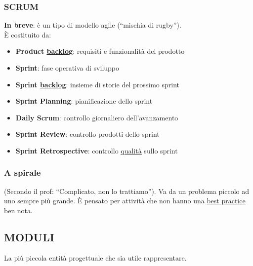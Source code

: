 			\subsubsection{SCRUM}		\label{scrum}
			\textbf{In breve}: è un tipo di modello agile (``mischia di rugby''). \\
			È costituito da:
				\begin{itemize}
					\item \textbf{Product \underline{\hyperref[backlog]{backlog}}}: requisiti e funzionalità del prodotto
					\item \textbf{Sprint}: fase operativa di sviluppo
					\item \textbf{Sprint \underline{\hyperref[backlog]{backlog}}}: insieme di storie del prossimo sprint
					\item \textbf{Sprint Planning}: pianificazione dello sprint
					\item \textbf{Daily Scrum}: controllo giornaliero dell'avanzamento
					\item \textbf{Sprint Review}: controllo prodotti dello sprint
					\item \textbf{Sprint Retrospective}: controllo \underline{\hyperref[qualita]{qualità}} sullo sprint
				\end{itemize}

			\subsubsection{A spirale} 
			(Secondo il prof: ``Complicato, non lo trattiamo''). Va da un problema piccolo ad uno sempre più grande. È pensato per attività che non hanno una \underline{\hyperref[best]{best practice}} ben nota.


		\subsection{MODULI}		\label{moduli}
		La più piccola entità progettuale che sia utile rappresentare.
